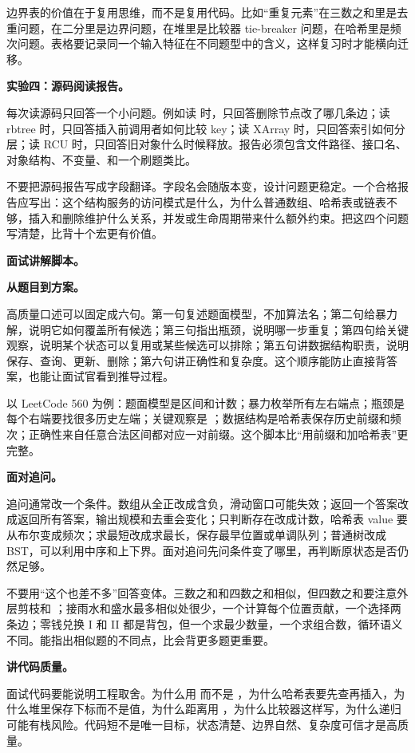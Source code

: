 边界表的价值在于复用思维，而不是复用代码。比如“重复元素”在三数之和里是去重问题，在二分里是边界问题，在堆里是比较器 tie-breaker 问题，在哈希里是频次问题。表格要记录同一个输入特征在不同题型中的含义，这样复习时才能横向迁移。

\noindent\textbf{实验四：源码阅读报告。}

每次读源码只回答一个小问题。例如读  时，只回答删除节点改了哪几条边；读 rbtree 时，只回答插入前调用者如何比较 key；读 XArray 时，只回答索引如何分层；读 RCU 时，只回答旧对象什么时候释放。报告必须包含文件路径、接口名、对象结构、不变量、和一个刷题类比。

不要把源码报告写成字段翻译。字段名会随版本变，设计问题更稳定。一个合格报告应写出：这个结构服务的访问模式是什么，为什么普通数组、哈希表或链表不够，插入和删除维护什么关系，并发或生命周期带来什么额外约束。把这四个问题写清楚，比背十个宏更有价值。

\noindent\textbf{面试讲解脚本。}

\noindent\textbf{从题目到方案。}

高质量口述可以固定成六句。第一句复述题面模型，不加算法名；第二句给暴力解，说明它如何覆盖所有候选；第三句指出瓶颈，说明哪一步重复；第四句给关键观察，说明某个状态可以复用或某些候选可以排除；第五句讲数据结构职责，说明保存、查询、更新、删除；第六句讲正确性和复杂度。这个顺序能防止直接背答案，也能让面试官看到推导过程。

以 LeetCode 560 为例：题面模型是区间和计数；暴力枚举所有左右端点；瓶颈是每个右端要找很多历史左端；关键观察是 ；数据结构是哈希表保存历史前缀和频次；正确性来自任意合法区间都对应一对前缀。这个脚本比“用前缀和加哈希表”更完整。

\noindent\textbf{面对追问。}

追问通常改一个条件。数组从全正改成含负，滑动窗口可能失效；返回一个答案改成返回所有答案，输出规模和去重会变化；只判断存在改成计数，哈希表 value 要从布尔变成频次；求最短改成求最长，保存最早位置或单调队列；普通树改成 BST，可以利用中序和上下界。面对追问先问条件变了哪里，再判断原状态是否仍然足够。

不要用“这个也差不多”回答变体。三数之和和四数之和相似，但四数之和要注意外层剪枝和 ；接雨水和盛水最多相似处很少，一个计算每个位置贡献，一个选择两条边；零钱兑换 I 和 II 都是背包，但一个求最少数量，一个求组合数，循环语义不同。能指出相似题的不同点，比会背更多题更重要。

\noindent\textbf{讲代码质量。}

面试代码要能说明工程取舍。为什么用  而不是 ，为什么哈希表要先查再插入，为什么堆里保存下标而不是值，为什么距离用 ，为什么比较器这样写，为什么递归可能有栈风险。代码短不是唯一目标，状态清楚、边界自然、复杂度可信才是高质量。

